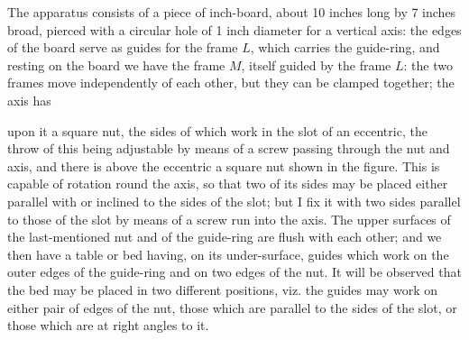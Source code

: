 \documentclass[11pt,a4paper]{article}
\begin{document}
The apparatus consists of a piece of inch-board, about 10 inches long by 7 inches
broad, pierced with a circular hole of 1 inch diameter for a vertical axis: the edges
of the board serve as guides for the frame \(L\), which carries the guide-ring, and
resting on the board we have the frame \(M\), itself guided by the frame \(L\): the
two frames move independently of each other, but they can be clamped together; the
axis has

\begin{center}
\end{center}

upon it a square nut, the sides of which work in the slot of an eccentric, the throw
of this being adjustable by means of a screw passing through the nut and axis, and
there is above the eccentric a square nut shown in the figure. This is capable of
rotation round the axis, so that two of its sides may be placed either parallel with
or inclined to the sides of the slot; but I fix it with two sides parallel to those of
the slot by means of a screw run into the axis. The upper surfaces of the last-mentioned
nut and of the guide-ring are flush with each other; and we then have a table or bed
having, on its under-surface, guides which work on the outer edges of the guide-ring
and on two edges of the nut. It will be observed that the bed may be placed in two
different positions, viz. the guides may work on either pair of edges of the nut, those
which are parallel to the sides of the slot, or those which are at right angles to it.
\end{document}
